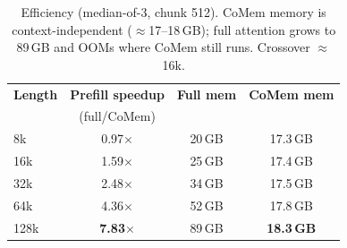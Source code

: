 \begin{table}[t]
\centering
\small
\begin{tabular}{@{}lccc@{}}
\toprule
\textbf{Length} & \textbf{Prefill speedup} & \textbf{Full mem} & \textbf{CoMem mem} \\
 & (full/CoMem) & & \\
\midrule
8k & 0.97$\times$ & 20\,GB & 17.3\,GB \\
16k & 1.59$\times$ & 25\,GB & 17.4\,GB \\
32k & 2.48$\times$ & 34\,GB & 17.5\,GB \\
64k & 4.36$\times$ & 52\,GB & 17.8\,GB \\
128k & \textbf{7.83}$\times$ & 89\,GB & \textbf{18.3\,GB} \\
\bottomrule
\end{tabular}
\caption{Efficiency (median-of-3, chunk 512). CoMem memory is context-independent ($\approx$17--18\,GB); full attention grows to 89\,GB and OOMs where CoMem still runs. Crossover $\approx$16k.}
\label{tab:eff}
\end{table}
